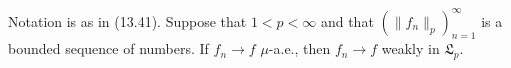 Notation is as in (13.41). Suppose that $1 < p < \infty$ and that $(\|f_n\|_p)_{n=1}^{\infty}$ is a bounded sequence of numbers. If $f_n \rightarrow f$ $\mu$-a.e., then $f_n \rightarrow f$ weakly in $\mathfrak{L}_p$.